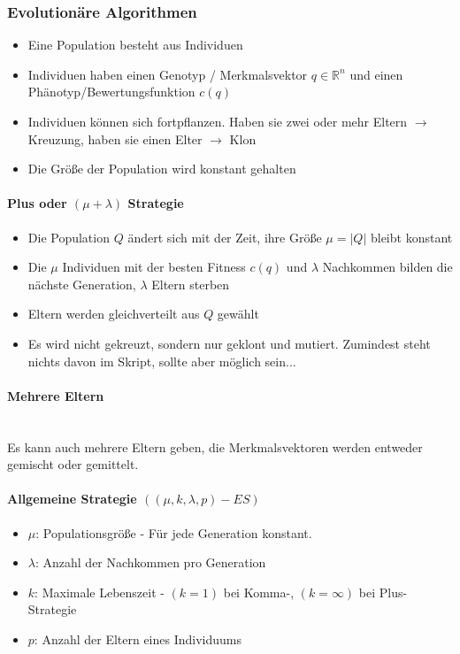 \subsubsection{Evolutionäre Algorithmen}
\begin{itemize}
	\item Eine Population besteht aus Individuen
	\item Individuen haben einen Genotyp / Merkmalsvektor \(q \in \mathbb{R}^n\) und einen Phänotyp/Bewertungsfunktion \(c(q)\)
	\item Individuen können sich fortpflanzen. Haben sie zwei oder mehr Eltern $\rightarrow$ Kreuzung, haben sie einen Elter $\rightarrow$ Klon
	\item Die Größe der Population wird konstant gehalten
\end{itemize}

\paragraph{Plus oder $(\mu + \lambda)$ Strategie}
\begin{itemize}
	\item Die Population \(Q\) ändert sich mit der Zeit, ihre Größe \(\mu = |Q|\) bleibt konstant
	\item Die \(\mu\) Individuen mit der besten Fitness \(c(q)\) und \(\lambda\) Nachkommen bilden die nächste Generation, \(\lambda\) Eltern sterben
	\item Eltern werden gleichverteilt aus \(Q\) gewählt
	\item Es wird nicht gekreuzt, sondern nur geklont und mutiert. Zumindest steht nichts davon im Skript, sollte aber möglich sein...
\end{itemize}

\paragraph{Mehrere Eltern}
\text{ }\\Es kann auch mehrere Eltern geben, die Merkmalsvektoren werden entweder gemischt oder gemittelt.


\paragraph{Allgemeine Strategie $((\mu, k, \lambda, p) - ES)$}
\begin{itemize}
	\item \(\mu\): Populationsgröße - Für jede Generation konstant.
	\item \(\lambda\): Anzahl der Nachkommen pro Generation
	\item \(k\): Maximale Lebenszeit - \((k = 1)\) bei Komma-, \((k=\infty)\) bei Plus-Strategie
	\item \(p\): Anzahl der Eltern eines Individuums
\end{itemize}

